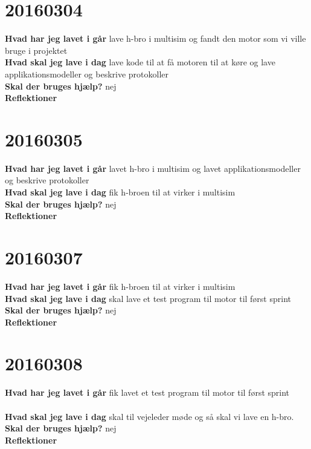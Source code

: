 \documentclass{article}
\begin{document}
			\section{20160304}
			
			\textbf{Hvad har jeg lavet i går}
			lave h-bro i multisim og fandt den motor som vi ville bruge i projektet
			\\
			\textbf{Hvad skal jeg lave i dag}
			lave kode til at få motoren til at køre og lave  applikationsmodeller og beskrive protokoller
			\\
			\textbf{Skal der bruges hjælp?}
			nej
			\\
			\textbf{Reflektioner}
			\section{20160305}
			
			\textbf{Hvad har jeg lavet i går}
			lavet h-bro i multisim og lavet  applikationsmodeller og beskrive protokoller
			\\
			\textbf{Hvad skal jeg lave i dag}
			fik h-broen til at virker i multisim
			\\
			\textbf{Skal der bruges hjælp?}
			nej
			\\
			\textbf{Reflektioner}
			
			\section{20160307}
			
			\textbf{Hvad har jeg lavet i går}
				fik h-broen til at virker i multisim
			\\
			\textbf{Hvad skal jeg lave i dag}
		skal lave et test program til motor til først sprint
			\\
			\textbf{Skal der bruges hjælp?}
			nej
			\\
			\textbf{Reflektioner}
			
				\section{20160308}
				
				\textbf{Hvad har jeg lavet i går}
				fik lavet et test program til motor til først sprint
				\\	
				\\
				\textbf{Hvad skal jeg lave i dag}
			skal til vejeleder møde og så skal vi lave en h-bro.
				\\
				\textbf{Skal der bruges hjælp?}
				nej
				\\
				\textbf{Reflektioner}
				
\end{document}
